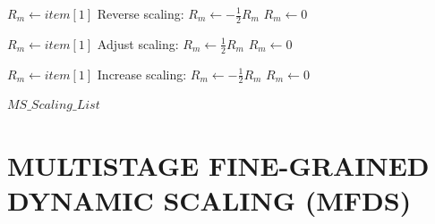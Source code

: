 \begin{algorithm}[H]
\caption{MSO (Part 2)}
\begin{algorithmic}[1]

        \State $R_m \leftarrow item[1]$
            \State Reverse scaling: $R_m \leftarrow -\frac{1}{2} R_m$
        \Else
            \State $R_m \leftarrow 0$
        \EndIf
    \EndFor
\EndIf

        \State $R_m \leftarrow item[1]$
            \State Adjust scaling: $R_m \leftarrow \frac{1}{2} R_m$
        \Else
            \State $R_m \leftarrow 0$
        \EndIf
    \EndFor
\EndIf

        \State $R_m \leftarrow item[1]$
            \State Increase scaling: $R_m \leftarrow -\frac{1}{2} R_m$
        \Else
            \State $R_m \leftarrow 0$
        \EndIf
    \EndFor
\EndIf

\State \Return $MS\_Scaling\_List$

\end{algorithmic}
\end{algorithm}
\pagebreak

\section{MULTISTAGE FINE-GRAINED DYNAMIC SCALING (MFDS)}

